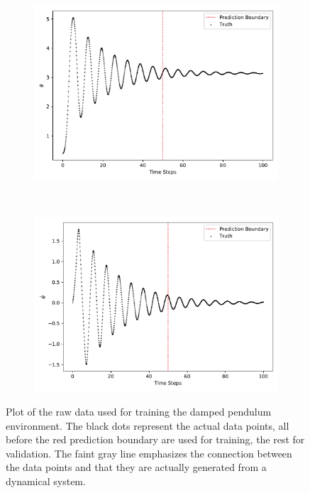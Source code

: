 			\begin{figure}
				\centering
				\begin{subfigure}{0.5\linewidth}
					\centering
					\includegraphics[width=\linewidth]{figures/experiments/environments/observations-pendulum-damped-N0-D0.pdf}
				\end{subfigure}%
				~
				\begin{subfigure}{0.5\linewidth}
					\centering
					\includegraphics[width=\linewidth]{figures/experiments/environments/observations-pendulum-damped-N0-D1.pdf}
				\end{subfigure}
				\caption{Plot of the raw data used for training the damped pendulum environment. The black dots represent the actual data points, all before the red prediction boundary are used for training, the rest for validation. The faint gray line emphasizes the connection between the data points and that they are actually generated from a dynamical system.}
				\label{fig:envPendulumDamped}
			\end{figure}

